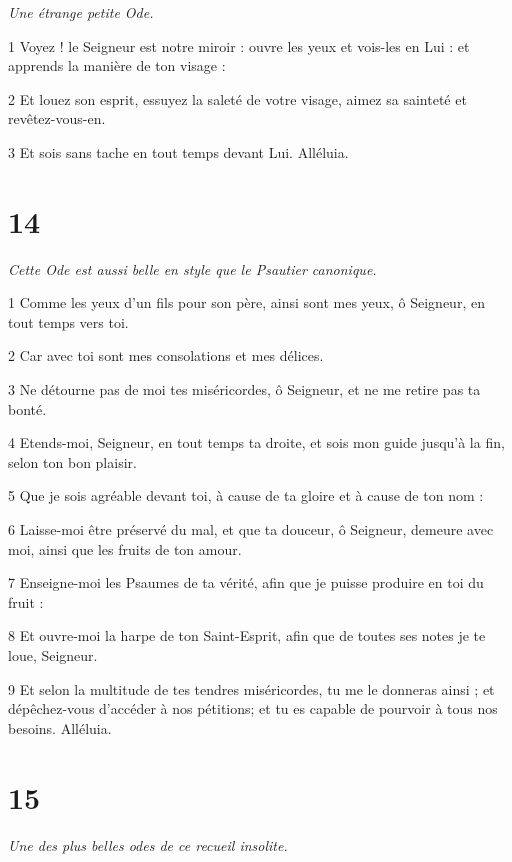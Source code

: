 \par \textit{Une étrange petite Ode.}

\par 1 Voyez ! le Seigneur est notre miroir : ouvre les yeux et vois-les en Lui : et apprends la manière de ton visage :
\par 2 Et louez son esprit, essuyez la saleté de votre visage, aimez sa sainteté et revêtez-vous-en.
\par 3 Et sois sans tache en tout temps devant Lui. Alléluia.

\chapter{14}

\par \textit{Cette Ode est aussi belle en style que le Psautier canonique.}

\par 1 Comme les yeux d'un fils pour son père, ainsi sont mes yeux, ô Seigneur, en tout temps vers toi.
\par 2 Car avec toi sont mes consolations et mes délices.
\par 3 Ne détourne pas de moi tes miséricordes, ô Seigneur, et ne me retire pas ta bonté.
\par 4 Etends-moi, Seigneur, en tout temps ta droite, et sois mon guide jusqu'à la fin, selon ton bon plaisir.
\par 5 Que je sois agréable devant toi, à cause de ta gloire et à cause de ton nom :
\par 6 Laisse-moi être préservé du mal, et que ta douceur, ô Seigneur, demeure avec moi, ainsi que les fruits de ton amour.
\par 7 Enseigne-moi les Psaumes de ta vérité, afin que je puisse produire en toi du fruit :
\par 8 Et ouvre-moi la harpe de ton Saint-Esprit, afin que de toutes ses notes je te loue, Seigneur.
\par 9 Et selon la multitude de tes tendres miséricordes, tu me le donneras ainsi ; et dépêchez-vous d'accéder à nos pétitions; et tu es capable de pourvoir à tous nos besoins. Alléluia.



\chapter{15}

\par \textit{Une des plus belles odes de ce recueil insolite.}

